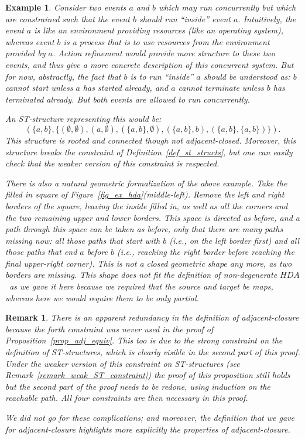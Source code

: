 \documentclass[submission,copyright,creativecommons]{eptcs}
\newtheorem{example}[theorem]{Example}
\newtheorem{remark}[theorem]{Remark}
\newcommand\HDA{\ensuremath{\mathit{HDA}}}
\begin{document}
\begin{example}\label{example_weakerConstraint_on_ST}
Consider two events $a$ and $b$ which may run concurrently but which are constrained such that the event $b$ should run ``inside'' event $a$. Intuitively, the event $a$ is like an environment providing resources (like an operating system), whereas event $b$ is a process that is to use resources from the environment provided by $a$. Action refinement would provide more structure to these two events, and thus give a more concrete description of this concurrent system. But for now, abstractly, the fact that $b$ is to run ``inside'' $a$ should be understood as: $b$ cannot start unless $a$ has started already, and $a$ cannot terminate unless $b$ has terminated already. But both events are allowed to run concurrently.

An ST-structure representing this would be: 
\[
(\{a,b\},\{(\emptyset,\emptyset),(a,\emptyset),(\{a,b\},\emptyset),(\{a,b\},b),(\{a,b\},\{a,b\})\}).
\]
This structure is rooted and connected though not adjacent-closed. Moreover, this structure breaks the constraint of Definition~\ref{def_st_structs}, but one can easily check that the weaker version of this constraint is respected.

There is also a natural geometric formalization of the above example. Take the filled in square of Figure~\ref{fig_ex_hda}(middle-left). Remove the left and right borders of the square, leaving the inside filled in, as well as all the corners and the two remaining upper and lower borders. This space is directed as before, and a path through this space can be taken as before, only that there are many paths missing now: all those paths that start with $b$ (i.e., on the left border first) and all those paths that end $a$ before $b$ (i.e., reaching the right border before reaching the final upper-right corner). This is not a closed geometric shape any more, as two borders are missing. This shape does not fit the definition of non-degenerate \HDA\ as we gave it here because we required that the source and target be \textit{maps}, whereas here we would require them to be only \textit{partial}. 
\end{example}



\begin{remark}\label{remark_redundancy}
There is an apparent redundancy in the definition of adjacent-closure because the forth constraint was never used in the proof of Proposition~\ref{prop_adj_equiv}. This too is due to the strong constraint on the definition of ST-structures, which is clearly visible in the second part of this proof.
Under the weaker version of this constraint on ST-structures (see Remark~\ref{remark_weak_ST_constraint}) the proof of this proposition still holds but the second part of the proof needs to be redone, using induction on the reachable path. All four constraints are then necessary in this proof.

We did not go for these complications; and moreover, the definition that we gave for adjacent-closure highlights more explicitly the properties of adjacent-closure. 
\end{remark}
\end{document}
